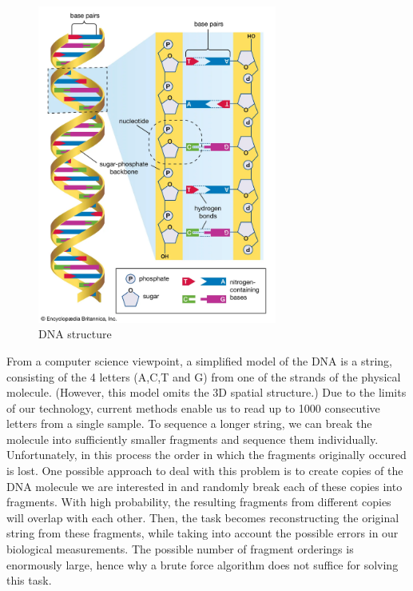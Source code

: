 \begin{figure}[H]
    \centering
    \includegraphics[width=0.7\textwidth]{figures/bioinformatics/dna.png}
    \caption{DNA structure\cite{dna_sequencing}}
\end{figure}

From a computer science viewpoint, a simplified model of the DNA is a string, consisting of the 4 letters (A,C,T and G) from one of the strands of the physical molecule. (However, this model omits the 3D spatial structure.) Due to the limits of our technology, current methods enable us to read up to 1000 consecutive letters from a single sample. To sequence a longer string, we can break the molecule into sufficiently smaller fragments and sequence them individually. Unfortunately, in this process the order in which the fragments originally occured is lost. One possible approach to deal with this problem is to create copies of the DNA molecule we are interested in and randomly break each of these copies into fragments. With high probability, the resulting fragments from different copies will overlap with each other. Then, the task becomes reconstructing the original string from these fragments, while taking into account the possible errors in our biological measurements. The possible number of fragment orderings is enormously large, hence why a brute force algorithm does not suffice for solving this task.\cite{CollinsHumanGenome1995}

